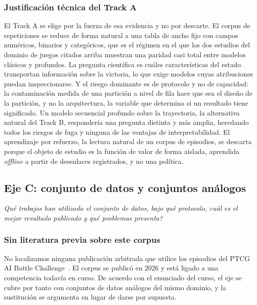\documentclass[conference]{IEEEtran}
\begin{document}
\subsubsection{Justificaci\'on t\'ecnica del Track A}
El Track A se elige por la fuerza de esa evidencia y no por descarte. El
corpus de repeticiones se reduce de forma natural a una tabla de ancho fijo
con campos num\'ericos, binarios y categ\'oricos, que es el r\'egimen en el
que los dos estudios del dominio de juegos citados arriba muestran una
paridad casi total entre modelos cl\'asicos y profundos. La pregunta
cient\'ifica es cu\'ales caracter\'isticas del estado transportan
informaci\'on sobre la victoria, lo que exige modelos cuyas atribuciones
puedan inspeccionarse. Y el riesgo dominante es de protocolo y no de
capacidad: la contaminaci\'on medida de una partici\'on a nivel de fila hace
que sea el dise\~no de la partici\'on, y no la arquitectura, la variable que
determina si un resultado tiene significado. Un modelo secuencial profundo
sobre la trayectoria, la alternativa natural del Track B, responder\'ia
una pregunta distinta y m\'as amplia, heredando todos los riesgos de fuga y
ninguna de las ventajas de interpretabilidad. El aprendizaje por refuerzo,
la lectura natural de un corpus de episodios, se descarta porque el objeto
de estudio es la funci\'on de valor de forma aislada, aprendida
\emph{offline} a partir de desenlaces registrados, y no una pol\'itica.

\subsection{Eje C: conjunto de datos y conjuntos an\'alogos}
\label{subsec:axisc}
\emph{\textquestiondown Qu\'e trabajos han utilizado el conjunto de datos, bajo qu\'e
protocolo, cu\'al es el mejor resultado publicado y qu\'e problemas
presenta?}

\subsubsection{Sin literatura previa sobre este corpus}
No localizamos ninguna publicaci\'on arbitrada que utilice los episodios del
PTCG AI Battle Challenge~\cite{ptcg_dataset_2026}. El corpus se public\'o en
2026 y est\'a ligado a una competencia todav\'ia en curso. De acuerdo con el
enunciado del curso, el eje se cubre por tanto con conjuntos de datos
an\'alogos del mismo dominio, y la sustituci\'on se argumenta en lugar de
darse por supuesta.
\end{document}
